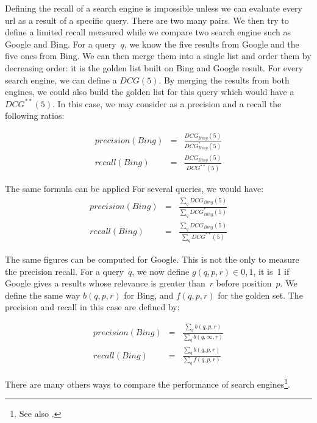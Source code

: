 Defining the recall of a search engine is impossible unless we can evaluate every url as a result of a specific query. There are two many pairs. We then try to define a limited recall measured while we compare two search engine such as Google and Bing. For a query~$q$, we know the five results from Google and the five ones from Bing. We can then merge them into a single list and order them by decreasing order: it is the golden list built on Bing and Google result. For every search engine, we can define a $DCG(5)$. By merging the results from both engines, we could also build the golden list for this query which would have a $DCG^{**}(5)$. In this case, we may consider as a precision and a recall the following ratios:

\begin{eqnarray}
precision(Bing) &=& \frac{DCG_{Bing}(5)}{DCG^*_{Bing}(5)}\\
recall(Bing)    &=& \frac{DCG_{Bing}(5)}{DCG^{**}(5)} 
\end{eqnarray}

The same formula can be applied For several queries, we would have:
\begin{eqnarray}
precision(Bing) &=& \frac{\sum_q DCG_{Bing}(5)}{\sum_q DCG^*_{Bing}(5)}\\
recall(Bing)    &=& \frac{\sum_q DCG_{Bing}(5)}{\sum_q DCG^{**}(5)} 
\end{eqnarray}

The same figures can be computed for Google. This is not the only to measure the precision recall. For a query~$q$, we now define $g(q,p,r) \in {0,1}$, it is~1 if Google gives a results whose relevance is greater than~$r$ before position~$p$. We define the same way $b(q,p,r)$ for Bing, and $f(q,p,r)$ for the golden set. The precision and recall in this case are defined by:

\begin{eqnarray}
precision(Bing) &=& \frac{\sum_q b(q,p,r)}{\sum_q b(q,\infty,r)}\\
recall(Bing)    &=& \frac{\sum_q b(q,p,r)}{\sum_q f(q,p,r)} 
\end{eqnarray}

There are many others ways to compare the performance of search engines\footnote{See also .}.








